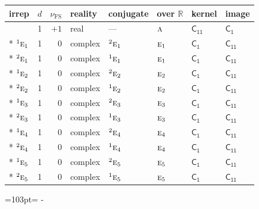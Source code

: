 \documentclass[10pt,a4paper]{article}
\newcommand{\needspace}[1]{\par\penalty-100\begingroup\dimen0=#1\relax\dimen2=\pagegoal
  \advance\dimen2-\pagetotal\ifdim\dimen0>\dimen2\relax\ifdim\dimen2>0pt\vfil\break\fi\fi
  \endgroup}
\numberwithin{equation}{section}
\newcommand{\grp}[1]{\mathsf{#1}}
\newcommand{\irr}[1]{\text{\normalfont\scshape #1}}
\newcommand{\conjpair}[1]{{}^{#1}}
\newcommand{\detbox}[1]{{\setlength{\fboxsep}{1pt}\fbox{#1}}}
\newcommand{\fsind}{\nu_{\mathrm{FS}}}
\begin{document}
{\small\renewcommand{\arraystretch}{1.25}\setlength{\tabcolsep}{4pt}\begin{longtable}{@{}lrrlllll@{}}\toprule
irrep & $d$ & $\fsind$ & reality & conjugate & over $\mathbb{R}$ & kernel & image\\\midrule\endhead
\bottomrule\endfoot\endlastfoot
\detbox{$\irr{a}$} & 1 & $+1$ & real & --- & $\irr{a}$ & \href{C11.pdf}{$\grp{C_{11}}$} & \href{C1.pdf}{$\grp{C_{1}}$}\\*
$\conjpair{1}\irr{e}_{1}$ & 1 & $0$ & complex & $\conjpair{2}\irr{e}_{1}$ & $\irr{e}_{1}$ & \href{C1.pdf}{$\grp{C_{1}}$} & \href{C11.pdf}{$\grp{C_{11}}$}\\*
$\conjpair{2}\irr{e}_{1}$ & 1 & $0$ & complex & $\conjpair{1}\irr{e}_{1}$ & $\irr{e}_{1}$ & \href{C1.pdf}{$\grp{C_{1}}$} & \href{C11.pdf}{$\grp{C_{11}}$}\\*
$\conjpair{1}\irr{e}_{2}$ & 1 & $0$ & complex & $\conjpair{2}\irr{e}_{2}$ & $\irr{e}_{2}$ & \href{C1.pdf}{$\grp{C_{1}}$} & \href{C11.pdf}{$\grp{C_{11}}$}\\*
$\conjpair{2}\irr{e}_{2}$ & 1 & $0$ & complex & $\conjpair{1}\irr{e}_{2}$ & $\irr{e}_{2}$ & \href{C1.pdf}{$\grp{C_{1}}$} & \href{C11.pdf}{$\grp{C_{11}}$}\\*
$\conjpair{1}\irr{e}_{3}$ & 1 & $0$ & complex & $\conjpair{2}\irr{e}_{3}$ & $\irr{e}_{3}$ & \href{C1.pdf}{$\grp{C_{1}}$} & \href{C11.pdf}{$\grp{C_{11}}$}\\*
$\conjpair{2}\irr{e}_{3}$ & 1 & $0$ & complex & $\conjpair{1}\irr{e}_{3}$ & $\irr{e}_{3}$ & \href{C1.pdf}{$\grp{C_{1}}$} & \href{C11.pdf}{$\grp{C_{11}}$}\\*
$\conjpair{1}\irr{e}_{4}$ & 1 & $0$ & complex & $\conjpair{2}\irr{e}_{4}$ & $\irr{e}_{4}$ & \href{C1.pdf}{$\grp{C_{1}}$} & \href{C11.pdf}{$\grp{C_{11}}$}\\*
$\conjpair{2}\irr{e}_{4}$ & 1 & $0$ & complex & $\conjpair{1}\irr{e}_{4}$ & $\irr{e}_{4}$ & \href{C1.pdf}{$\grp{C_{1}}$} & \href{C11.pdf}{$\grp{C_{11}}$}\\*
$\conjpair{1}\irr{e}_{5}$ & 1 & $0$ & complex & $\conjpair{2}\irr{e}_{5}$ & $\irr{e}_{5}$ & \href{C1.pdf}{$\grp{C_{1}}$} & \href{C11.pdf}{$\grp{C_{11}}$}\\*
$\conjpair{2}\irr{e}_{5}$ & 1 & $0$ & complex & $\conjpair{1}\irr{e}_{5}$ & $\irr{e}_{5}$ & \href{C1.pdf}{$\grp{C_{1}}$} & \href{C11.pdf}{$\grp{C_{11}}$}\\
\bottomrule\end{longtable}}
\needspace{103pt}
\end{document}

